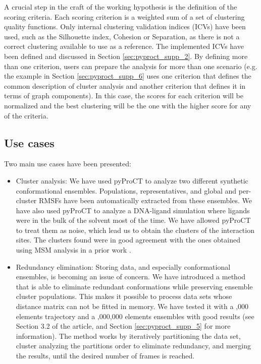 A crucial step in the craft of the working hypothesis is the definition of the scoring criteria. Each scoring
criterion is a weighted sum of a set of clustering quality functions. Only internal clustering validation indices
(ICVs) have been used, such as the Silhouette index, Cohesion or Separation, as there is not a correct
clustering available to use as a reference. The implemented ICVs have been defined and discussed in Section \ref{sec:pyproct_supp_2}. 
By defining more than one criterion, users can prepare the analysis for more than one
scenario (e.g. the example in Section \ref{sec:pyproct_supp_6} uses one criterion that defines the common
description of cluster analysis and another criterion that defines it in terms of graph components). In this case, the scores
for each criterion will be normalized and the best clustering will be the one with the higher score for any of the
criteria.

\subsection{Use cases}

Two main use cases have been presented:

\begin{itemize}
\item Cluster analysis: We have used pyProCT to analyze two different synthetic conformational ensembles. 
Populations, representatives, and global and per-cluster RMSFs have been automatically extracted from these ensembles. We have also used
pyProCT to analyze a DNA-ligand simulation where ligands were  in the bulk of the solvent most of the time. We have allowed
pyProCT to treat them as noise, which lead us to obtain the clusters of the interaction sites. The clusters found were
in good agreement with the ones obtained using MSM analysis in a prior work
\cite{lucas_atomic_2014}. 
\item Redundancy elimination: Storing data, and especially conformational ensembles, is becoming an issue of concern. We
have introduced a method that is able to eliminate redundant conformations while preserving ensemble cluster
populations. This makes it possible to process data sets whose distance matrix can not be fitted in memory. We have
tested it with a ,000 elements trajectory and a ,000,000 elements ensembles with good results (see Section 3.2
 of the article, and Section \ref{sec:pyproct_supp_5} for more information). The method works by iteratively
partitioning the data set, cluster analyzing the partitions order to eliminate redundancy, and merging the results, until the
desired number of frames is reached. 
\end{itemize}


